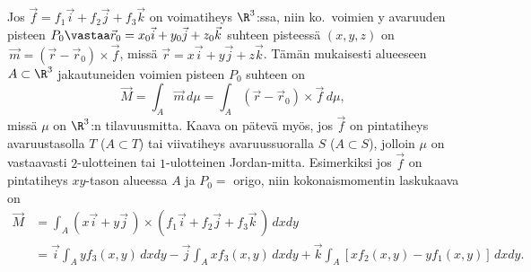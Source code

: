 Jos $\vec f=f_1\vec i+f_2\vec j+f_3\vec k$ on voimatiheys $\R^3$:ssa, niin ko.\ voimien
y avaruuden pisteen 
$P_0\vastaa \vec r_0=x_0\vec i+y_0\vec j+z_0\vec k$ suhteen pisteessä $(x,y,z)$ on 
$\,\vec m=(\vec r-\vec r_0)\times\vec f$, missä $\vec r=x\vec i+y\vec j+z\vec k$.
Tämän mukaisesti alueeseen $A\subset\R^3$ jakautuneiden voimien 
pisteen $P_0$ suhteen on
\[
\vec M = \int_A \vec m\,d\mu
       = \int_A(\vec r-\vec r_0)\times\vec f\,d\mu,
\]
missä $\mu$ on $\R^3$:n tilavuusmitta. Kaava on pätevä myös, jos $\vec f$ on pintatiheys
avaruustasolla $T$ ($A \subset T$) tai viivatiheys avaruussuoralla $S$ ($A \subset S$),
jolloin $\mu$ on vastaavasti $2$-ulotteinen tai $1$-ulotteinen Jordan-mitta. Esimerkiksi
jos $\vec f$ on pintatiheys $xy$-tason alueessa $A$ ja $P_0=$ origo, niin kokonaismomentin
laskukaava on
\begin{align*}
\vec M &= \int_A (x\vec i+y\vec j\,)\times(f_1\vec i+f_2\vec j+f_3\vec k\,)\,dxdy \\
       &= \vec i\int_A yf_3(x,y)\,dxdy-\vec j\int_A xf_3(x,y)\,dxdy
                                      +\vec k \int_A [xf_2(x,y)-yf_1(x,y)]\,dxdy.
\end{align*}

